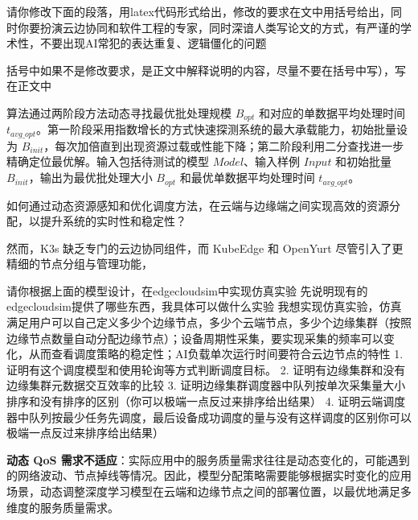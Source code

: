 请你修改下面的段落，用latex代码形式给出，修改的要求在文中用括号给出，同时你要扮演云边协同和软件工程的专家，同时深谙人类写论文的方式，有严谨的学术性，不要出现AI常犯的表达重复、逻辑僵化的问题



括号中如果不是修改要求，是正文中解释说明的内容，尽量不要在括号中写），写在正文中


算法通过两阶段方法动态寻找最优批处理规模 $B_{opt}$ 和对应的单数据平均处理时间 $t_{avg\_opt}$。第一阶段采用指数增长的方式快速探测系统的最大承载能力，初始批量设为 $B_{init}$，每次加倍直到出现资源过载或性能下降；第二阶段利用二分查找进一步精确定位最优解。输入包括待测试的模型 $Model$、输入样例 $Input$ 和初始批量 $B_{init}$，输出为最优批处理大小 $B_{opt}$ 和最优单数据平均处理时间 $t_{avg\_opt}$。

如何通过动态资源感知和优化调度方法，在云端与边缘端之间实现高效的资源分配，以提升系统的实时性和稳定性？

然而，K3s 缺乏专门的云边协同组件，而 KubeEdge 和 OpenYurt 尽管引入了更精细的节点分组与管理功能，

请你根据上面的模型设计，在edgecloudsim中实现仿真实验 先说明现有的edgecloudsim提供了哪些东西，我具体可以做什么实验 我想实现仿真实验，仿真满足用户可以自己定义多少个边缘节点，多少个云端节点，多少个边缘集群（按照边缘节点数量自动分配边缘节点）；设备周期性采集，要实现采集的频率可以变化，从而查看调度策略的稳定性；AI负载单次运行时间要符合云边节点的特性  1. 证明有这个调度模型和使用轮询等方式判断调度目标。  2. 证明有边缘集群和没有边缘集群元数据交互效率的比较  3. 证明边缘集群调度器中队列按单次采集量大小排序和没有排序的区别（你可以极端一点反过来排序给出结果）  4. 证明云端调度器中队列按最少任务先调度，最后设备成功调度的量与没有这样调度的区别你可以极端一点反过来排序给出结果）

\item \textbf{动态 QoS 需求不适应}：实际应用中的服务质量需求往往是动态变化的，可能遇到的网络波动、节点掉线等情况。因此，模型分配策略需要能够根据实时变化的应用场景，动态调整深度学习模型在云端和边缘节点之间的部署位置，以最优地满足多维度的服务质量需求。